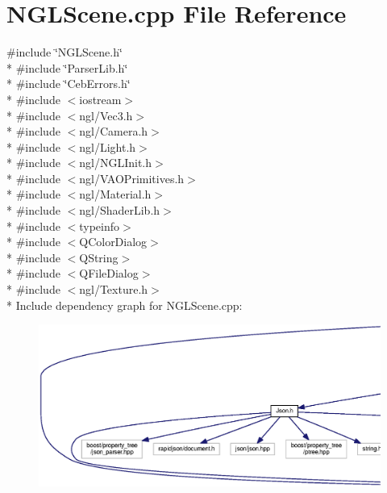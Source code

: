 \section{N\-G\-L\-Scene.\-cpp File Reference}
\label{_n_g_l_scene_8cpp}
{\ttfamily \#include \char`\"{}N\-G\-L\-Scene.\-h\char`\"{}}\\*
{\ttfamily \#include \char`\"{}Parser\-Lib.\-h\char`\"{}}\\*
{\ttfamily \#include \char`\"{}Ceb\-Errors.\-h\char`\"{}}\\*
{\ttfamily \#include $<$iostream$>$}\\*
{\ttfamily \#include $<$ngl/\-Vec3.\-h$>$}\\*
{\ttfamily \#include $<$ngl/\-Camera.\-h$>$}\\*
{\ttfamily \#include $<$ngl/\-Light.\-h$>$}\\*
{\ttfamily \#include $<$ngl/\-N\-G\-L\-Init.\-h$>$}\\*
{\ttfamily \#include $<$ngl/\-V\-A\-O\-Primitives.\-h$>$}\\*
{\ttfamily \#include $<$ngl/\-Material.\-h$>$}\\*
{\ttfamily \#include $<$ngl/\-Shader\-Lib.\-h$>$}\\*
{\ttfamily \#include $<$typeinfo$>$}\\*
{\ttfamily \#include $<$Q\-Color\-Dialog$>$}\\*
{\ttfamily \#include $<$Q\-String$>$}\\*
{\ttfamily \#include $<$Q\-File\-Dialog$>$}\\*
{\ttfamily \#include $<$ngl/\-Texture.\-h$>$}\\*
Include dependency graph for N\-G\-L\-Scene.\-cpp\-:
\nopagebreak
\begin{figure}[H]
\begin{center}
\leavevmode
\includegraphics[width=350pt]{_n_g_l_scene_8cpp__incl}
\end{center}
\end{figure}
